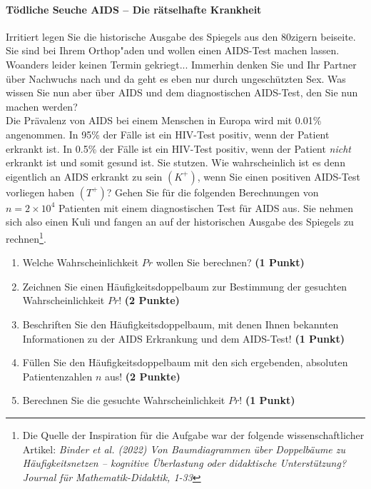 \documentclass[a4paper, 9pt]{scrartcl}\usepackage[]{graphicx}\usepackage[]{xcolor}
\begin{document}
\paragraph{T{\"o}dliche Seuche AIDS -- Die r{\"a}tselhafte Krankheit}




Irritiert legen Sie die historische Ausgabe des Spiegels aus den 80zigern
beiseite. Sie sind bei Ihrem Orthop{"a}den und wollen einen AIDS-Test machen
lassen. Woanders leider keinen Termin gekriegt... Immerhin denken Sie und
Ihr Partner {\"u}ber Nachwuchs nach und da geht es eben nur durch
ungesch{\"u}tzten Sex. Was wissen Sie nun aber {\"u}ber AIDS und dem diagnostischen
AIDS-Test, den Sie nun machen werden?\\

Die Pr{\"a}valenz von AIDS bei einem Menschen in Europa wird mit
0.01\% angenommen. In 95\% der F{\"a}lle ist ein
HIV-Test positiv, wenn der Patient erkrankt ist. In 0.5\%
der F{\"a}lle ist ein HIV-Test positiv, wenn der Patient \textit{nicht}
erkrankt ist und somit gesund ist. Sie stutzen. Wie wahrscheinlich ist es
denn eigentlich an AIDS erkrankt zu sein $(K^+)$, wenn Sie einen positiven
AIDS-Test vorliegen haben $(T^+)$? Gehen Sie f{\"u}r die folgenden Berechnungen
von $n = \ensuremath{2\times 10^{4}}$ Patienten mit einem diagnostischen Test f{\"u}r AIDS
aus. Sie nehmen sich also einen Kuli und fangen an auf der historischen
Ausgabe des Spiegels zu rechnen\footnote{Die Quelle der Inspiration f{\"u}r die
  Aufgabe war der folgende wissenschaftlicher Artikel: \textit{Binder et
    al. (2022) Von Baumdiagrammen {\"u}ber Doppelb{\"a}ume zu H{\"a}ufigkeitsnetzen --
    kognitive {\"U}berlastung oder didaktische Unterst{\"u}tzung? Journal f{\"u}r
    Mathematik-Didaktik, 1-33}}.

\begin{enumerate}
\item Welche Wahrscheinlichkeit $Pr$ wollen Sie berechnen? \textbf{(1 Punkt)}
\item Zeichnen Sie einen H{\"a}ufigkeitsdoppelbaum zur Bestimmung der gesuchten
  Wahrscheinlichkeit $Pr$! \textbf{(2 Punkte)} 
\item Beschriften Sie den H{\"a}ufigkeitsdoppelbaum, mit denen Ihnen bekannten
  Informationen zu der AIDS Erkrankung und dem AIDS-Test! \textbf{(1 Punkt)}
\item F{\"u}llen Sie den H{\"a}ufigkeitsdoppelbaum mit den sich ergebenden,
  absoluten Patientenzahlen $n$ aus! \textbf{(2 Punkte)}
\item Berechnen Sie die gesuchte Wahrscheinlichkeit $Pr$! \textbf{(1 Punkt)}
\end{enumerate}
\end{document}
